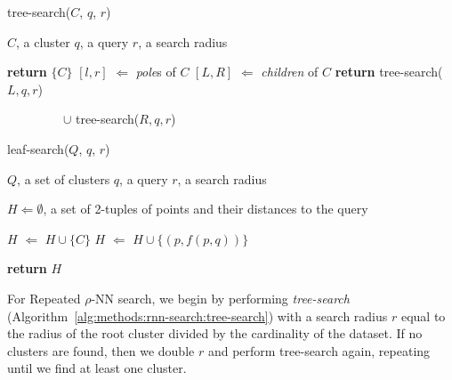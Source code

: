 \begin{minipage}{.425\textwidth}
    \begin{algorithm}[H]\small
        \caption{tree-search($C$, $q$, $r$)}
        \label{alg:methods:rnn-search:tree-search}
        \begin{algorithmic}
            \Require $C$, a cluster
            \Require $q$, a query
            \Require $r$, a search radius

                \State \textbf{return} $\{C\}$
            \Else
                \State $[l, r]$ $\Leftarrow$ \textit{pole}s of $C$
                \State $[L, R]$ $\Leftarrow$ \textit{children} of $C$
                \State \textbf{return} tree-search($L, q, r$)

                \ \ \ \ \ \ \ \ \ $\cup$ tree-search($R, q, r$)
            \EndIf

        \end{algorithmic}
    \end{algorithm}
\end{minipage}
\hfill
\begin{minipage}{.45\textwidth}
    \begin{algorithm}[H]\small
        \caption{leaf-search($Q$, $q$, $r$)}
        \label{alg:methods:rnn-search:leaf-search}
        \begin{algorithmic}
            \Require $Q$, a set of clusters
            \Require $q$, a query
            \Require $r$, a search radius

            \State $H \Leftarrow \emptyset$, a set of 2-tuples of points and their distances to the query

                    \State $H$ $\Leftarrow$ $H \cup \{C\}$
                \Else
                            \State $H$ $\Leftarrow$ $H \cup \{(p, f(p, q))\}$
                        \EndIf
                    \EndFor
                \EndIf
            \EndFor

            \State \textbf{return} $H$
        \end{algorithmic}
    \end{algorithm}
\end{minipage}


For Repeated $\rho$-NN search, we begin by performing \textit{tree-search} (Algorithm~\ref{alg:methods:rnn-search:tree-search}) with a search radius $r$ equal to the radius of the root cluster divided by the cardinality of the dataset.
If no clusters are found, then we double $r$ and perform tree-search again, repeating until we find at least one cluster.

